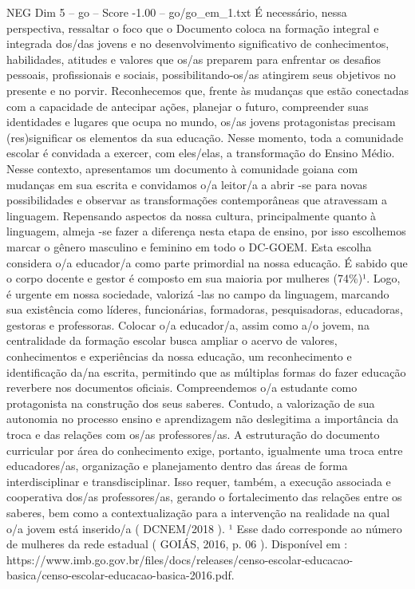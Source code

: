 \begin{textsample}{NEG Dim 5 – go – Score -1.00 – go/go\_em\_1.txt}
É necessário, nessa perspectiva, ressaltar o foco que o Documento coloca na formação integral e integrada dos/das jovens e no desenvolvimento significativo de conhecimentos, habilidades, atitudes e valores que os/as preparem para enfrentar os desafios pessoais, profissionais e sociais, possibilitando-os/as atingirem seus objetivos no presente e no porvir.
Reconhecemos que, frente às mudanças que estão conectadas com a capacidade de antecipar ações, planejar o futuro, compreender suas identidades e lugares que ocupa no mundo, os/as jovens protagonistas precisam (res)significar os elementos da sua educação.
Nesse momento, toda a comunidade escolar é convidada a exercer, com eles/elas, a transformação do Ensino Médio.
Nesse contexto, apresentamos um documento à comunidade goiana com mudanças em sua escrita e convidamos o/a leitor/a a abrir -se para novas possibilidades e observar as transformações contemporâneas que atravessam a linguagem.
Repensando aspectos da nossa cultura, principalmente quanto à linguagem, almeja -se fazer a diferença nesta etapa de ensino, por isso escolhemos marcar o gênero masculino e feminino em todo o DC-GOEM.
Esta escolha considera o/a educador/a como parte primordial na nossa educação.
É sabido que o corpo docente e gestor é composto em sua maioria por mulheres (74\%)¹.
Logo, é urgente em nossa sociedade, valorizá -las no campo da linguagem, marcando sua existência como líderes, funcionárias, formadoras, pesquisadoras, educadoras, gestoras e professoras.
Colocar o/a educador/a, assim como a/o jovem, na centralidade da formação escolar busca ampliar o acervo de valores, conhecimentos e experiências da nossa educação, um reconhecimento e identificação da/na escrita, permitindo que as múltiplas formas do fazer educação reverbere nos documentos oficiais.
Compreendemos o/a estudante como protagonista na construção dos seus saberes.
Contudo, a valorização de sua autonomia no processo ensino e aprendizagem não deslegitima a importância da troca e das relações com os/as professores/as.
A estruturação do documento curricular por área do conhecimento exige, portanto, igualmente uma troca entre educadores/as, organização e planejamento dentro das áreas de forma interdisciplinar e transdisciplinar.
Isso requer, também, a execução associada e cooperativa dos/as professores/as, gerando o fortalecimento das relações entre os saberes, bem como a contextualização para a intervenção na realidade na qual o/a jovem está inserido/a ( DCNEM/2018 ). ¹ Esse dado corresponde ao número de mulheres da rede estadual ( GOIÁS, 2016, p. 06 ).
Disponível em : https://www.imb.go.gov.br/files/docs/releases/censo-escolar-educacao-basica/censo-escolar-educacao-basica-2016.pdf.

\end{textsample}
